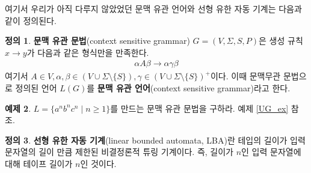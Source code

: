 \documentclass[b5paper, 11pt]{book}
\theoremstyle{definition}
\newtheorem{defn}{정의}[chapter]
\newtheorem{ex}[defn]{예제}
\begin{document}
여기서 우리가 아직 다루지 않았었던 문맥 유관 언어와 선형 유한 자동 기계는 다음과 같이 정의된다. 
\begin{defn}
    \textbf{문맥 유관 문법}(context sensitive grammar) $G = (V, \Sigma, S, P)$은 생성 규칙
    $x \rightarrow y$가 다음과 같은 형식만을 만족한다.
    \begin{align*}
        \alpha A \beta \rightarrow \alpha \gamma \beta
    \end{align*}
    여기서 $A \in V, \alpha, \beta \in (V \cup \Sigma \setminus \{S\}), 
    \gamma \in (V \cup \Sigma \setminus \{S\})^+$이다.
    이때 문맥무관 문법으로 정의된 언어 $L(G)$를 \textbf{문맥 유관 언어}(context sensitive grammar)라고
    한다.
\end{defn}
\begin{ex}
    $L = \{ a^n b^n c^n \;\vert\; n \ge 1\}$를 만드는 문맥 유관 문법을 구하라. 예제 \ref{UG_ex} 참조.
\end{ex}
\begin{defn}
    \textbf{선형 유한 자동 기계}(linear bounded automata, LBA)란 테입의 길이가 입력 문자열의 길이 만큼 제한된 비결정론적 튜링 기계이다. 즉, 길이가 $n$인 입력 문자열에 대해 테이프 길이가 $n$인 것이다.
\end{defn}
\end{document}
